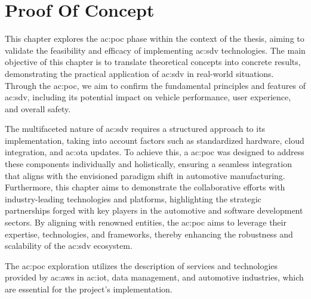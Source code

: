  \lstset{numbers=left}
 
\chapter{Proof Of Concept} \label{ch:proofOfConcept}

This chapter explores the \gls{ac:poc} phase within the context of the thesis, aiming to validate the feasibility and efficacy of implementing \gls{ac:sdv} technologies. The main objective of this chapter is to translate theoretical concepts into concrete results, demonstrating the practical application of \gls{ac:sdv} in real-world situations. Through the \gls{ac:poc}, we aim to confirm the fundamental principles and features of \gls{ac:sdv}, including its potential impact on vehicle performance, user experience, and overall safety.

The multifaceted nature of \gls{ac:sdv} requires a structured approach to its implementation, taking into account factors such as standardized hardware, cloud integration, and \gls{ac:ota} updates. To achieve this, a \gls{ac:poc} was designed to address these components individually and holistically, ensuring a seamless integration that aligns with the envisioned paradigm shift in automotive manufacturing. Furthermore, this chapter aims to demonstrate the collaborative efforts with industry-leading technologies and platforms, highlighting the strategic partnerships forged with key players in the automotive and software development sectors. By aligning with renowned entities, the \gls{ac:poc} aims to leverage their expertise, technologies, and frameworks, thereby enhancing the robustness and scalability of the \gls{ac:sdv} ecosystem.


The \gls{ac:poc} exploration utilizes the description of services and technologies provided by \gls{ac:aws} in \gls{ac:iot}, data management, and automotive industries, which are essential for the project's implementation.

